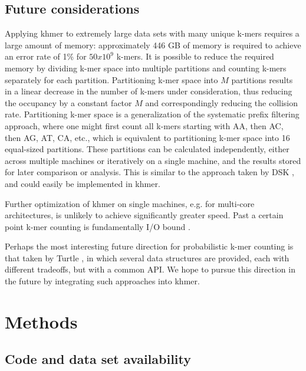 \documentclass{article}
\begin{document}
\subsection{Future considerations}

Applying khmer to extremely large data sets with many unique k-mers
requires a large amount of memory: approximately 446 GB of memory is
required to achieve an error rate of 1\% for
$50x10^9$ k-mers. It is possible to reduce the required memory by dividing
k-mer space into multiple partitions and counting k-mers separately
for each partition. Partitioning k-mer space into $M$ partitions
results in a linear decrease in the number of k-mers under
consideration, thus reducing the occupancy by a constant factor $M$
and correspondingly reducing the collision rate.  Partitioning k-mer
space is a generalization of the systematic prefix filtering approach,
where one might first count all k-mers starting with AA, then AC, then
AG, AT, CA, etc., which is equivalent to partitioning k-mer space into
16 equal-sized partitions. These partitions can be calculated
independently, either across multiple machines or iteratively on a
single machine, and the results stored for later comparison or
analysis.  This is similar to the approach taken by DSK
\cite{Rizk2013}, and could easily be implemented in khmer.

Further optimization of khmer on single machines, e.g. for multi-core
architectures, is unlikely to achieve significantly greater speed.
Past a certain point k-mer counting is fundamentally I/O bound
\cite{McDonald2013}.

Perhaps the most interesting future direction for probabilistic k-mer
counting is that taken by Turtle \cite{Roy2013}, in which several
data structures are provided, each with different tradeoffs, but with
a common API.  We hope to pursue this direction in the future by
integrating such approaches into khmer.

\section{Methods}

\subsection{Code and data set availability}
\end{document}
